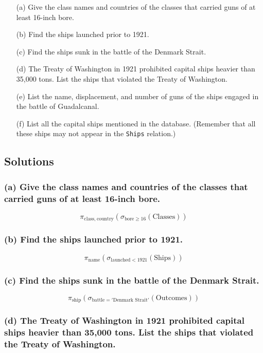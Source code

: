 \documentclass{cshwk}
\begin{document}
\begin{enumerate}
    \item[(a)] Give the class names and countries of the classes that carried guns of at least 16-inch bore.
    \item[(b)] Find the ships launched prior to 1921.
    \item[(c)] Find the ships sunk in the battle of the Denmark Strait.
    \item[(d)] The Treaty of Washington in 1921 prohibited capital ships heavier than 35,000 tons. List the ships that violated the Treaty of Washington.
    \item[(e)] List the name, displacement, and number of guns of the ships engaged in the battle of Guadalcanal.
    \item[(f)] List all the capital ships mentioned in the database. (Remember that all these ships may not appear in the \texttt{Ships} relation.)
\end{enumerate}



\subsection*{Solutions}

\subsubsection*{(a) Give the class names and countries of the classes that carried guns of at least 16-inch bore.}

\[
    \pi_{\text{class},\ \text{country}} ( \sigma_{\text{bore} \geq 16} (\text{Classes}) )
\]

\subsubsection*{(b) Find the ships launched prior to 1921.}

\[
    \pi_{\text{name}} ( \sigma_{\text{launched} < 1921} (\text{Ships}) )
\]

\subsubsection*{(c) Find the ships sunk in the battle of the Denmark Strait.}

\[
    \pi_{\text{ship}} ( \sigma_{\text{battle} = '\text{Denmark Strait}'} (\text{Outcomes}) )
\]

\subsubsection*{(d) The Treaty of Washington in 1921 prohibited capital ships heavier than 35,000 tons. List the ships that violated the Treaty of Washington.}
\end{document}
